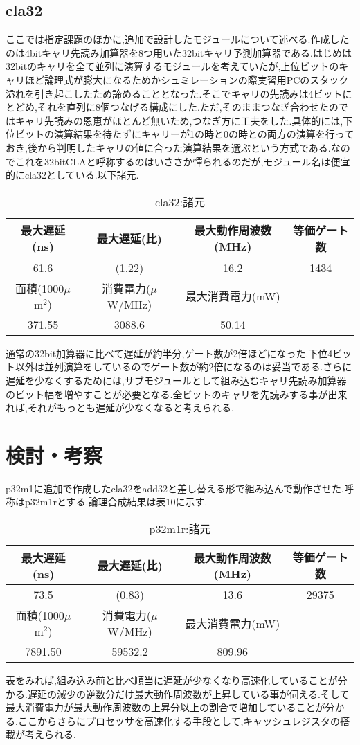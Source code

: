 \documentclass[11pt,a4j]{jarticle}
\begin{document}
\subsection{cla32}
ここでは指定課題のほかに,追加で設計したモジュールについて述べる.作成したのは4bitキャリ先読み加算器を8つ用いた32bitキャリ予測加算器である.はじめは32bitのキャリを全て並列に演算するモジュールを考えていたが,上位ビットのキャリほど論理式が膨大になるためかシュミレーションの際実習用PCのスタック溢れを引き起こしたため諦めることとなった.そこでキャリの先読みは4ビットにとどめ,それを直列に8個つなげる構成にした.ただ,そのままつなぎ合わせたのではキャリ先読みの恩恵がほとんど無いため,つなぎ方に工夫をした.具体的には,下位ビットの演算結果を待たずにキャリーが1の時と0の時との両方の演算を行っておき,後から判明したキャリの値に合った演算結果を選ぶという方式である.なのでこれを32bitCLAと呼称するのはいささか憚られるのだが,モジュール名は便宜的にcla32としている.以下諸元.\\
\begin{table}[htb]
\caption{cla32:諸元}
\begin{tabular}{|c|c|c|c|} \hline
最大遅延(ns) & 最大遅延(比) & 最大動作周波数(MHz) & 等価ゲート数 \\ \hline
61.6 & (1.22) & 16.2 & 1434 \\ \hline \hline
面積(1000$\mu$m$^2$) & 消費電力($\mu$W/MHz) & 最大消費電力(mW) & \\ \hline
371.55 & 3088.6 & 50.14 & \\ \hline
\end{tabular}
\end{table}
通常の32bit加算器に比べて遅延が約半分,ゲート数が2倍ほどになった.下位4ビット以外は並列演算をしているのでゲート数が約2倍になるのは妥当である.さらに遅延を少なくするためには,サブモジュールとして組み込むキャリ先読み加算器のビット幅を増やすことが必要となる.全ビットのキャリを先読みする事が出来れば,それがもっとも遅延が少なくなると考えられる.
\section{検討・考察}
p32m1に追加で作成したcla32をadd32と差し替える形で組み込んで動作させた.呼称はp32m1rとする.論理合成結果は表10に示す.\\
\begin{table}[htb]
\caption{p32m1r:諸元}
\begin{tabular}{|c|c|c|c|} \hline
最大遅延(ns) & 最大遅延(比) & 最大動作周波数(MHz) & 等価ゲート数 \\ \hline
73.5 & (0.83) & 13.6 & 29375 \\ \hline \hline
面積(1000$\mu$m$^2$) & 消費電力($\mu$W/MHz) & 最大消費電力(mW) & \\ \hline
7891.50 & 59532.2 & 809.96 & \\ \hline
\end{tabular}
\end{table}
表をみれば,組み込み前と比べ順当に遅延が少なくなり高速化していることが分かる.遅延の減少の逆数分だけ最大動作周波数が上昇している事が伺える.そして最大消費電力が最大動作周波数の上昇分以上の割合で増加していることが分かる.ここからさらにプロセッサを高速化する手段として,キャッシュレジスタの搭載が考えられる.
\end{document}
